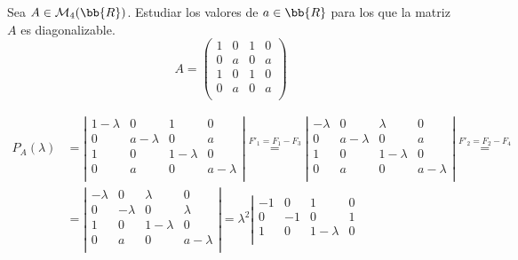 \begin{ejercicio}
    Sea $A\in \mathcal{M}_4(\bb{R})$. Estudiar los valores de $a\in\bb{R}$ para los que la matriz $A$ es diagonalizable.
    \begin{equation*}
        A = \left( \begin{array}{cccc}
            1 & 0 & 1 & 0 \\
            0 & a & 0 & a \\
            1 & 0 & 1 & 0 \\
            0 & a & 0 & a \\
        \end{array}\right)
    \end{equation*}

    \begin{equation*}\begin{split}
        P_A(\lambda) & = \left|\begin{array}{cccc}
            1-\lambda & 0 & 1 & 0 \\
            0 & a-\lambda & 0 & a \\
            1 & 0 & 1-\lambda & 0 \\
            0 & a & 0 & a-\lambda \\
        \end{array} \right| \stackrel{F'_1 = F_1 - F_3}{=} \left|\begin{array}{cccc}
            -\lambda & 0 & \lambda & 0 \\
            0 & a-\lambda & 0 & a \\
            1 & 0 & 1-\lambda & 0 \\
            0 & a & 0 & a-\lambda \\
        \end{array} \right|
        \stackrel{F'_2 = F_2 - F_4} {=} \\
        & = \left|\begin{array}{cccc}
            -\lambda & 0 & \lambda & 0 \\
            0 & -\lambda & 0 & \lambda \\
            1 & 0 & 1-\lambda & 0 \\
            0 & a & 0 & a-\lambda \\
        \end{array} \right| = \lambda^2 \left|\begin{array}{cccc}
            -1 & 0 & 1 & 0 \\
            0 & -1 & 0 & 1 \\
            1 & 0 & 1-\lambda & 0 \\

\end{array}
\end{split}
\end{equation*}
\end{ejercicio}
